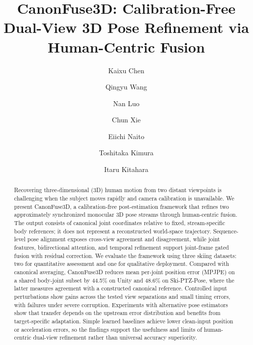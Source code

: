 \documentclass[preprint,12pt]{elsarticle}
\begin{document}
\begin{frontmatter}

\title{CanonFuse3D: Calibration-Free Dual-View 3D Pose Refinement via Human-Centric Fusion}

\author[ccs]{Kaixu Chen}
\author[imiss]{Qingyu Wang}
\author[imiss]{Nan Luo}
\author[ccs]{Chun Xie}
\author[nict]{Eiichi Naito}
\author[ntt]{Toshitaka Kimura}
\author[ccs]{Itaru Kitahara}

\address[ccs]{Center for Computational Sciences, University of Tsukuba, Tsukuba, Ibaraki, Japan}
\address[imiss]{Intelligent and Mechanical Interaction Systems, University of Tsukuba, Tsukuba, Ibaraki, Japan}
\address[nict]{Advanced ICT Research Institute, National Institute of Information and Communications Technology, Osaka, Japan}
\address[ntt]{NTT Communication Science Laboratories, Tokyo, Japan}

\begin{abstract}
Recovering three-dimensional (3D) human motion from two distant viewpoints is challenging when the subject moves rapidly and camera calibration is unavailable. We present CanonFuse3D, a calibration-free post-estimation framework that refines two approximately synchronized monocular 3D pose streams through human-centric fusion. The output consists of canonical joint coordinates relative to fixed, stream-specific body references; it does not represent a reconstructed world-space trajectory. Sequence-level pose alignment exposes cross-view agreement and disagreement, while joint features, bidirectional attention, and temporal refinement support joint-frame gated fusion with residual correction. We evaluate the framework using three skiing datasets: two for quantitative assessment and one for qualitative deployment. Compared with canonical averaging, CanonFuse3D reduces mean per-joint position error (MPJPE) on a shared body-joint subset by 44.5\% on Unity and 48.6\% on Ski-PTZ-Pose, where the latter measures agreement with a constructed canonical reference. Controlled input perturbations show gains across the tested view separations and small timing errors, with failures under severe corruption. Experiments with alternative pose estimators show that transfer depends on the upstream error distribution and benefits from target-specific adaptation. Simple learned baselines achieve lower clean-input position or acceleration errors, so the findings support the usefulness and limits of human-centric dual-view refinement rather than universal accuracy superiority.


\end{abstract}
\end{frontmatter}
\end{document}
